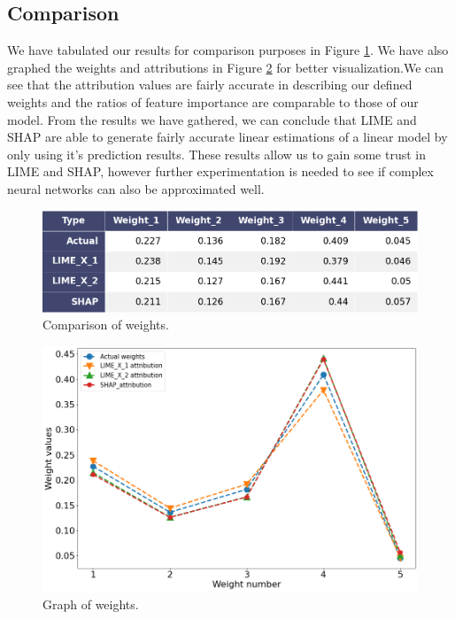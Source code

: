 \subsection{Comparison}
We have tabulated our results for comparison purposes in Figure \ref{fig:weight-tab}. We have also graphed the weights and attributions in Figure \ref{fig:weight-graph} for better visualization.We can see that the attribution values are fairly accurate in describing our defined weights and the ratios of feature importance are comparable to those of our model. From the results we have gathered, we can conclude that LIME and SHAP are able to generate fairly accurate linear estimations of a linear model by only using it's prediction results. These results allow us to gain some trust in LIME and SHAP, however further experimentation is needed to see if complex neural networks can also be approximated well.
\begin  {figure}[!htpb]
  \includegraphics[width=\linewidth]{Evaluation_Images/weight_table.png}
   \caption{Comparison of weights.}
    \label{fig:weight-tab}
\end{figure}

\begin  {figure}[!htpb]
  \includegraphics[width=\linewidth]{Evaluation_Images/weight_comp.png}
   \caption{Graph of weights.}
    \label{fig:weight-graph}
\end{figure}



